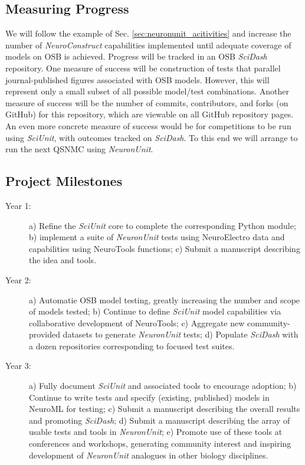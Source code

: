 \documentclass[11pt,letterpaper]{article}
\begin{document}
\subsection{Measuring Progress}
We will follow the example of Sec. \ref{sec:neuronunit_acitivities} and increase the number of \textit{NeuroConstruct} capabilities implemented until adequate coverage of models on OSB is achieved.  Progress will be tracked in an OSB \textit{SciDash} repository.  One measure of success will be construction of tests that parallel journal-published figures associated with OSB models.  However, this will represent only a small subset of all possible model/test combinations.  Another measure of success will be the number of commits, contributors, and forks (on GitHub) for this repository, which are viewable on all GitHub repository pages.  An even more concrete measure of success would be for competitions to be run using \textit{SciUnit}, with outcomes tracked on \textit{SciDash}.   To this end we will arrange to run the next QSNMC using \textit{NeuronUnit}.  

\subsection{Project Milestones}
\begin{description}
\item[Year 1:] a) Refine the \textit{SciUnit} core to complete the corresponding Python module; b) implement a suite of \textit{NeuronUnit} tests using NeuroElectro data and capabilities using NeuroTools functions; c) Submit a manuscript describing the idea and tools.  
\item[Year 2:] a) Automatie OSB model testing, greatly increasing the number and scope of models tested; b) Continue to define \textit{SciUnit} model capabilities via collaborative development of NeuroTools; c) Aggregate new community-provided datasets to generate \textit{NeuronUnit} tests; d) Populate \textit{SciDash} with a dozen repositories corresponding to focused test suites.    
\item[Year 3:] a) Fully document \textit{SciUnit} and associated tools to encourage adoption; b) Continue to write tests and specify (existing, published) models in NeuroML for testing; c) Submit a manuscript describing the overall results and promoting \textit{SciDash}; d) Submit a manuscript describing the array of usable tests and tools in \textit{NeuronUnit}; e) Promote use of these tools at conferences and workshops, generating community interest and inspiring development of \textit{NeuronUnit} analogues in other biology disciplines.  
\end{description}
\end{document}
